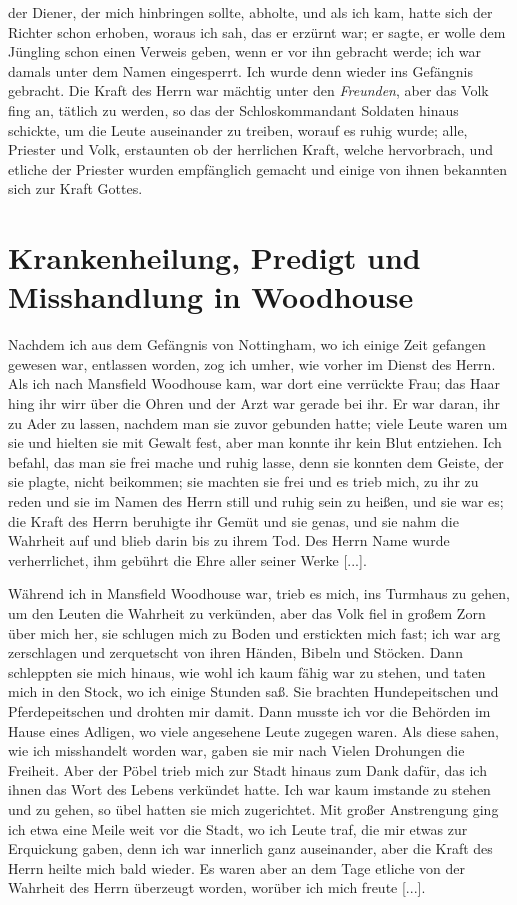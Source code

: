 der Diener, der mich hinbringen sollte, abholte, und als ich kam,
hatte sich der Richter schon erhoben, woraus ich sah, das er 
erzürnt war; er sagte, er wolle dem Jüngling schon einen Verweis
geben, wenn er vor ihn gebracht werde; ich war damals unter
dem Namen  eingesperrt. Ich wurde denn wieder
ins Gefängnis gebracht. Die Kraft des Herrn war mächtig
unter den \textit{Freunden}, aber das Volk fing an, tätlich zu
werden, so das der Schloskommandant Soldaten hinaus schickte,
um die Leute auseinander zu treiben, worauf es ruhig wurde;
alle, Priester und Volk, erstaunten ob der herrlichen Kraft, welche
hervorbrach, und etliche der Priester wurden empfänglich gemacht
und einige von ihnen bekannten sich zur Kraft Gottes.

\section{Krankenheilung, Predigt und Misshandlung in Woodhouse}

Nachdem ich aus dem Gefängnis von Nottingham, wo ich
einige Zeit gefangen gewesen war, entlassen worden, zog ich
umher, wie vorher im Dienst des Herrn. Als ich 
nach Mansfield
Woodhouse kam, war dort eine verrückte 
Frau; das Haar hing
ihr wirr über die Ohren und der Arzt war gerade bei ihr. Er
war daran, ihr zu Ader zu lassen, nachdem man sie zuvor 
gebunden hatte; viele Leute waren um sie und hielten sie mit 
Gewalt fest, aber man konnte ihr kein Blut entziehen. Ich befahl,
das man sie frei mache und ruhig lasse, denn sie konnten dem
Geiste, der sie plagte, nicht beikommen; sie machten sie frei und
es trieb mich, zu ihr zu reden und sie im Namen des Herrn still
und ruhig sein zu heißen, und sie war es; die Kraft des Herrn
beruhigte ihr Gemüt und sie genas, und sie nahm die Wahrheit
auf und blieb darin bis zu ihrem Tod. Des Herrn Name wurde
verherrlichet, ihm gebührt die Ehre aller seiner Werke [...].


Während ich in Mansfield Woodhouse war, trieb es mich,
ins Turmhaus zu gehen, um den Leuten die Wahrheit zu 
verkünden, aber das Volk fiel in großem Zorn über mich her, sie
schlugen mich zu Boden und erstickten mich fast; ich war arg 
zerschlagen und zerquetscht von ihren Händen, Bibeln und 
Stöcken.
Dann schleppten sie mich hinaus, wie wohl ich kaum fähig war
zu stehen, und taten mich in den Stock, wo ich einige Stunden
saß. Sie brachten Hundepeitschen und Pferdepeitschen und drohten
mir damit. Dann musste ich vor die Behörden im Hause eines
Adligen, wo viele angesehene Leute zugegen waren. Als diese
sahen, wie ich misshandelt worden war, gaben sie mir nach
Vielen Drohungen die Freiheit. Aber der Pöbel trieb mich
zur Stadt hinaus zum Dank dafür, das ich ihnen das Wort des
Lebens verkündet hatte. Ich war kaum imstande zu stehen und
zu gehen, so übel hatten sie mich zugerichtet. Mit großer 
Anstrengung ging ich etwa eine Meile weit vor die Stadt, wo ich
Leute traf, die mir etwas zur Erquickung gaben, denn ich war
innerlich ganz auseinander, aber die Kraft des Herrn heilte mich
bald wieder. Es waren aber an dem Tage etliche von der 
Wahrheit des Herrn überzeugt worden, worüber ich mich freute [...].

